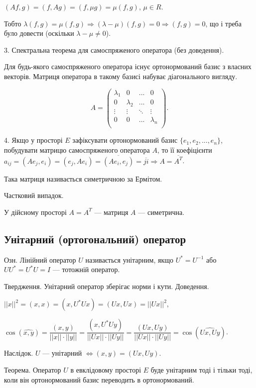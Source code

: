 $(A f, g) = (f, A g) = (f, \mu g) = \mu (f,g)$, $\mu \in R$.

Тобто $\lambda(f, g) = \mu(f,g) \Rightarrow (\lambda - \mu)(f, g) = 0 \Rightarrow (f,g) = 0$,
що і треба було довести (оскільки $\lambda - \mu \neq 0$).

3. Спектральна теорема для самоспряженого оператора (без доведення).

Для будь-якого самоспряженого оператора існує ортонормований базис з
власних векторів. Матриця оператора в такому базисі набуває діагонального
вигляду.

$$A = \begin{pmatrix}
	\lambda_1 & 0         & ...    & 0 \\	
	0         & \lambda_2 & ...    & 0 \\
	\vdots    & \vdots    & \ddots & \vdots \\
	0         & 0         & ...    & \lambda_n \\
\end{pmatrix}.$$

4. Якщо у просторі $E$ зафіксувати ортонормований базис $\{e_1, e_2, ..., e_n\}$,
побудувати матрицю самоспряженого оператора $A$, то її коефіцієнти
$a_{ij} = (A e_j, e_i) = (e_j, A e_i) = \overline{(A e_i, e_j)} = \overline{ji} \Rightarrow A = \overline{A^T}$.

Така матриця називається симетричною за Ермітом.

Частковий випадок.

У дійсному просторі $A = A^T$ --- матриця $A$ --- симетрична.

\subsection*{Унітарний (ортогональний) оператор}

Озн. Лінійний оператор $U$ називається унітарним, якщо $U^* = U^{-1}$ або
$U U^* = U^* U = I$ --- тотожній оператор.

Твердження. Унітарний оператор зберігає норми і кути.
Доведення.

$||x||^2 = (x,x) = (x,U^* U x) = (U x, U x) = ||Ux||^2$,

$\cos(\widehat{x,y})
= \dfrac{(x,y)}{||x|| \cdot ||y||}
= \dfrac{(x,U^* U y)}{||U x|| \cdot ||U y||}
= \dfrac{(U x, U y)}{||U x|| \cdot ||U y||}
= \cos(\widehat{Ux, Uy})$.

Наслідок. $U$ --- унітарний $\Leftrightarrow (x,y) = (U x, U y)$.

Теорема. Оператор $U$ в евклідовому просторі $E$ буде унітарним тоді і
тільки тоді, коли він ортонормований базис переводить в ортонормований.

